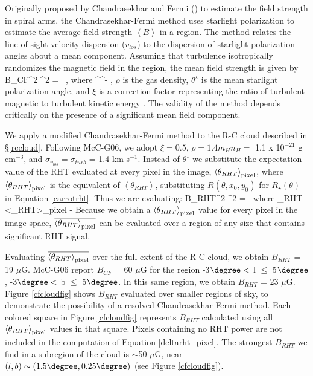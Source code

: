 Originally proposed by Chandrasekhar and Fermi (\citeyear{CHANDRASEKHAR:1953uq}) to estimate the field strength in spiral arms, the Chandrasekhar-Fermi method uses starlight polarization to estimate the average field strength ${\left< B \right>}$ in a region. The method relates the line-of-sight velocity dispersion (${v_{los}}$) to the dispersion of starlight polarization angles about a mean component. Assuming that turbulence isotropically randomizes the magnetic field in the region, the mean field strength is given by
\beq
B_{CF}^2 \equiv {}^2 = \pi\rho \, ,
\eeq
where
\beq
\delta^\star \equiv \theta^\star - \overline{\theta^\star },
\eeq
${\rho}$ is the gas density,  $\overline{\theta^\star }$ is the mean starlight polarization angle, and ${\xi}$ is a correction factor representing the ratio of turbulent magnetic to turbulent kinetic energy \citep[e.g.][]{Heitsch:2001da}. The validity of the method depends critically on the presence of a significant mean field component.

We apply a modified Chandrasekhar-Fermi method to the R-C cloud described in \S\ref{rccloud}. Following McC-G06, we adopt ${\xi = 0.5}$, ${\rho = 1.4m_Hn_H =}$ 1.1 x 10${^{-21}}$ g cm${^{-3}}$, and ${\sigma_{v_{los}} = \sigma_{turb}}$ = 1.4 km s${^{-1}}$. Instead of $\theta^\star$ we substitute the expectation value of the RHT evaluated at every pixel in the image, ${\left<\theta_{RHT}\right>}_{\rm pixel}$, where ${\left<\theta_{RHT}\right>}_{\rm pixel}$ is the equivalent of  ${\left<\theta_{RHT}\right>}$, substituting $R\left(\theta, x_0, y_0\right)$ for $R_\star\left(\theta\right)$ in Equation \ref{carrotrht}. Thus we are evaluating:
\beq
B_{RHT}^2 \equiv {}^2 = \pi\rho \, 
\eeq
where
\beq\label{deltarht_pixel}
\delta_{RHT} \equiv \left<\theta_{RHT}\right>_{\rm pixel} - 
\eeq
Because we obtain a ${\left<\theta_{RHT}\right>_{\rm pixel}}$ value for every pixel in the image space, ${\overline{\left<\theta_{RHT}\right>_{\rm pixel}}}$ can be evaluated over a region of any size that contains significant RHT signal.

Evaluating ${\overline{\left<\theta_{RHT}\right>_{\rm pixel}}}$ over the full extent of the R-C cloud, we obtain ${B_{RHT}}$ = 19 ${\mu}$G. McC-G06 report ${B_{CF}}$ = 60 ${\mu}$G for the region -3${\degree <}$ l ${\le}$ 5${\degree}$,  -3${\degree <}$ b ${\le}$ 5${\degree}$. In this same region, we obtain ${B_{RHT}}$ = 23 ${\mu}$G. Figure \ref{cfcloudfig} shows ${B_{RHT}}$ evaluated over smaller regions of sky, to demonstrate the possibility of a resolved Chandrasekhar-Fermi method. Each colored square in Figure \ref{cfcloudfig} represents $B_{RHT}$ calculated using all ${\left<\theta_{RHT}\right>_{\rm pixel}}$ values in that square. Pixels containing no RHT power are not included in the computation of Equation \ref{deltarht_pixel}. The strongest ${B_{RHT}}$ we find in a subregion of the cloud is ${\sim}$50 ${\mu}$G, near $(l, b) \sim (1.5\degree, 0.25\degree)$ (see Figure \ref{cfcloudfig}).

